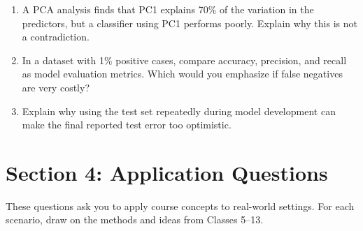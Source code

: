 \documentclass[11pt]{article}
\begin{document}
\begin{enumerate}[leftmargin=*, resume]
\item A PCA analysis finds that PC1 explains 70\% of the variation in the predictors, but a classifier using PC1 performs poorly. Explain why this is not a contradiction.

\item In a dataset with 1\% positive cases, compare accuracy, precision, and recall as model evaluation metrics. Which would you emphasize if false negatives are very costly?

\item Explain why using the test set repeatedly during model development can make the final reported test error too optimistic.

\end{enumerate}


\newpage
\section*{Section 4: Application Questions}

These questions ask you to apply course concepts to real-world settings. For each scenario, draw on the methods and ideas from Classes 5--13.

\bigskip
\end{document}
